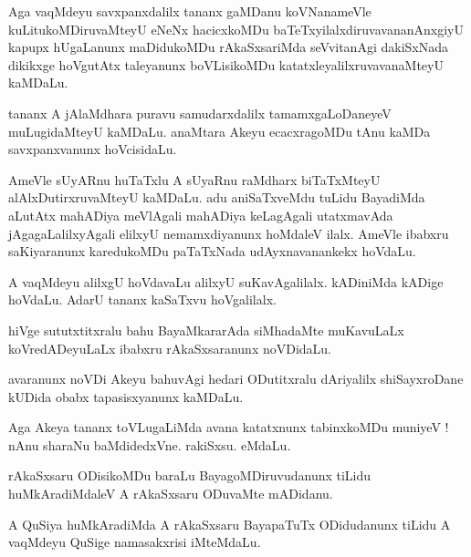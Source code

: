 \documentclass{article}
\begin{document}
\begin{mn}%
Aga vaqMdeyu savxpanxdalilx tananx gaMDanu koVNanameVle kuLitukoMDiruvaMteyU eNeNx hacicxkoMDu 
baTeTxyilalxdiruvavananAnxgiyU kapupx hUgaLanunx maDidukoMDu rAkaSxsariMda seVvitanAgi dakiSxNada 
dikikxge hoVgutAtx taleyanunx boVLisikoMDu katatxleyalilxruvavanaMteyU kaMDaLu.
\end{mn}

\begin{mn}%
tananx A jAlaMdhara puravu samudarxdalilx tamamxgaLoDaneyeV muLugidaMteyU kaMDaLu. anaMtara Akeyu 
ecacxragoMDu tAnu kaMDa savxpanxvanunx hoVcisidaLu.
\end{mn}

\begin{mn}%
AmeVle sUyARnu huTaTxlu A sUyaRnu raMdharx biTaTxMteyU alAlxDutirxruvaMteyU kaMDaLu. adu 
aniSaTxveMdu tuLidu BayadiMda aLutAtx mahADiya meVlAgali mahADiya keLagAgali utatxmavAda 
jAgagaLalilxyAgali elilxyU nemamxdiyanunx hoMdaleV ilalx. AmeVle ibabxru saKiyaranunx karedukoMDu 
paTaTxNada udAyxnavanankekx hoVdaLu.
\end{mn}

\begin{mn}%
A vaqMdeyu alilxgU hoVdavaLu alilxyU suKavAgalilalx. kADiniMda kADige hoVdaLu. AdarU tananx 
kaSaTxvu hoVgalilalx.
\end{mn}

\begin{mn}%
hiVge sututxtitxralu bahu BayaMkararAda siMhadaMte muKavuLaLx koVredADeyuLaLx ibabxru 
rAkaSxsaranunx noVDidaLu.
\end{mn}

\begin{mn}%
avaranunx noVDi Akeyu bahuvAgi hedari ODutitxralu dAriyalilx shiSayxroDane kUDida obabx 
tapasisxyanunx kaMDaLu.
\end{mn}

\begin{mn}%
Aga Akeya tananx toVLugaLiMda avana katatxnunx tabinxkoMDu muniyeV ! nAnu sharaNu baMdidedxVne. 
rakiSxsu. eMdaLu.
\end{mn}

\begin{mn}%
rAkaSxsaru ODisikoMDu baraLu BayagoMDiruvudanunx tiLidu huMkAradiMdaleV A rAkaSxsaru ODuvaMte 
mADidanu.
\end{mn}

\begin{mn}%
A QuSiya huMkAradiMda A rAkaSxsaru BayapaTuTx ODidudanunx tiLidu A vaqMdeyu QuSige namasakxrisi 
iMteMdaLu.
\end{mn}
\end{document}
